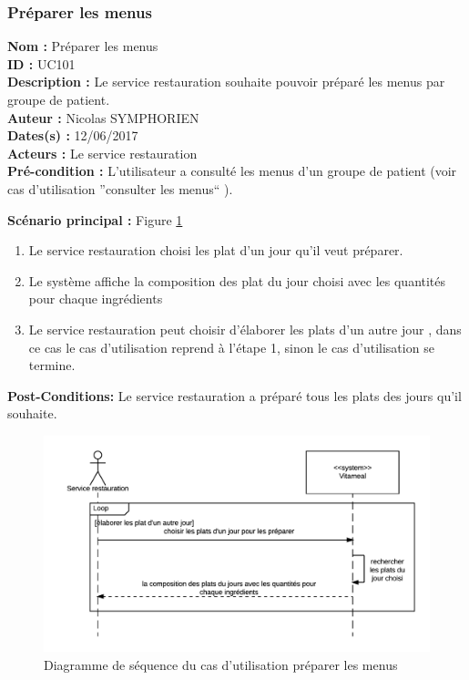 \subsubsection{Préparer les menus}

\noindent\textbf{Nom :} Préparer les menus \\
\textbf{ID :} UC101 \\
\textbf{Description :} Le service restauration souhaite pouvoir préparé les menus par groupe de patient. \\
\textbf{Auteur :} Nicolas SYMPHORIEN \\
\textbf{Dates(s) :} 12/06/2017 \\
\textbf{Acteurs :} Le service restauration \\
\textbf{Pré-condition :} L'utilisateur a consulté les menus d'un groupe de patient (voir cas d'utilisation ''consulter les menus`` ).

\noindent \textbf{Scénario principal : } Figure \ref{PreparerMenuSeq}

\begin{enumerate}
	\item Le service restauration choisi les plat d'un jour qu'il veut préparer.
	\item Le système affiche la composition des plat du jour choisi avec les quantités pour chaque ingrédients
	\item Le service restauration peut choisir d'élaborer les plats d'un autre jour , dans ce cas le cas d'utilisation reprend à l'étape 1, sinon le cas d'utilisation se termine.
\end{enumerate}

\noindent \textbf{Post-Conditions:} Le service restauration a préparé tous les plats des jours qu'il souhaite.

\begin{figure}
\centering
\includegraphics{../../CasDUtilisations/PreparerMenus/sequence_preparer_menus.png}
\caption{Diagramme de séquence du cas d'utilisation préparer les menus}
\label{PreparerMenuSeq}
\end{figure}